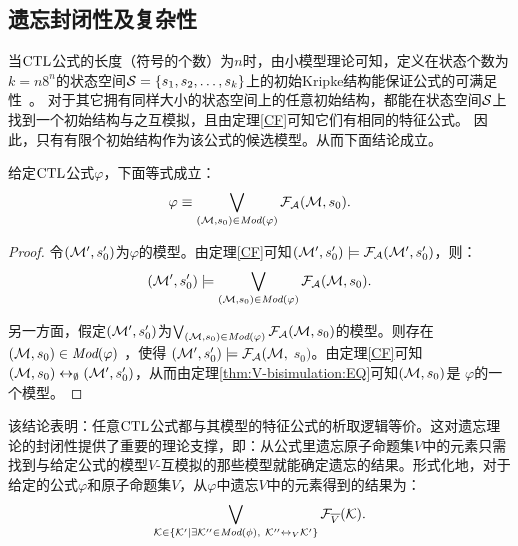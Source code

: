 \subsection{遗忘封闭性及复杂性}\label{chapter06:sec:close}
当$\textrm{CTL}$公式的长度（符号的个数）为$n$时，由小模型理论可知，定义在状态个数为$k=n8^n$的状态空间${\cal S}=\{s_1,s_2,\dots, s_k\}$上的初始Kripke结构能保证公式的可满足性~\cite{DBLP:journals/jcss/EmersonH85}。
对于其它拥有同样大小的状态空间上的任意初始结构，都能在状态空间${\cal S}$上找到一个初始结构与之互模拟，且由定理\ref{CF}可知它们有相同的特征公式。
因此，只有有限个初始结构作为该公式的候选模型。从而下面结论成立。

\begin{lemma}\label{lem:models:formula}
	给定$\textrm{CTL}$公式$\varphi$，下面等式成立：
	\begin{equation*}
		\varphi\equiv \bigvee_{({\cal M}, s_0)\in\textit{Mod}(\varphi)}{\cal F}_{\cal A}({\cal M}, s_0).
	\end{equation*}
\end{lemma}
\begin{proof}
	令$({\cal M}', s_0')$为$\varphi$的模型。由定理\ref{CF}可知$({\cal M}', s_0') \models {\cal F}_{{\cal A}}({\cal M}', s_0')$，则：
	$$({\cal M}', s_0') \models \bigvee_{({\cal M}, s_0)\in \textit{Mod}(\varphi)} {\cal F}_{{\cal A}}({\cal M}, s_0).$$
	
	另一方面，假定$({\cal M}', s_0')$为$\bigvee_{({\cal M}, s_0)\in \textit{Mod}(\varphi)} {\cal F}_{{\cal A}}({\cal M}, s_0)$的模型。则存在$({\cal M}, s_0)\in \textit{Mod}(\varphi)$ ，使得 $({\cal M}', s_0') \models {\cal F}_{{\cal A}}({\cal M},$ $s_0)$。由定理\ref{CF}可知$({\cal M}, s_0) \leftrightarrow_{\emptyset} ({\cal M}', s_0')$，从而由定理\ref{thm:V-bisimulation:EQ}可知$({\cal M}, s_0)$是 $\varphi$的一个模型。
\end{proof}

该结论表明：任意$\textrm{CTL}$公式都与其模型的特征公式的析取逻辑等价。这对遗忘理论的封闭性提供了重要的理论支撑，即：从公式里遗忘原子命题集$V$中的元素只需找到与给定公式的模型$V$-互模拟的那些模型就能确定遗忘的结果。形式化地，对于给定的公式$\varphi$和原子命题集$V$，从$\varphi$中遗忘$V$中的元素得到的结果为：
\begin{equation*}
	\bigvee_{{\cal K}\in  \{{\cal K}'\mid \exists {\cal K}''\in\textit{Mod}(\phi),\ {\cal K}''\leftrightarrow_V{\cal K}'\}} {\cal F}_{\overline V}({\cal K}).
\end{equation*}



